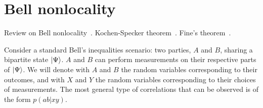 \documentclass[a4paper]{report}
\newcommand{\PP}{\mathbb{P}}
\newcommand{\calE}{{\mathcal{E}}}
\begin{document}

\chapter{Bell nonlocality}

Review on Bell nonlocality~\autocite{brunner2014bell}.
Kochen-Specker theorem~\autocite{kochen1967problem}.
Fine's theorem~\autocite{fine1982joint,fine1982hidden}.

Consider a standard Bell's inequalities scenario: two parties, $A$ and $B$, sharing a bipartite state $\ket\Psi$. $A$ and $B$ can perform measurements on their respective parts of $\ket\Psi$. We will denote with $A$ and $B$ the random variables corresponding to their outcomes, and with $X$ and $Y$ the random variables corresponding to their choices of measurements.
The most general type of correlations that can be observed is of the form $p(ab|xy)$.
\end{document}

